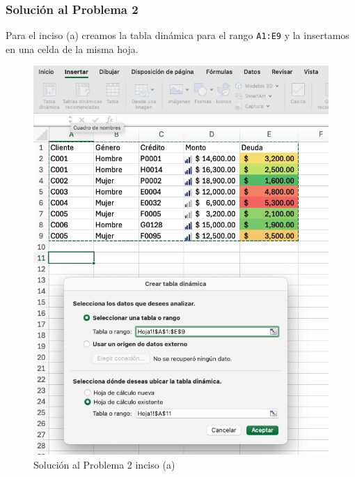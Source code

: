 \documentclass{article}
\begin{document}
\clearpage

\subsubsection*{Solución al Problema 2}

Para el inciso (a) creamos la tabla dinámica para el rango \texttt{A1:E9} y la insertamos en una celda de la misma hoja.
\begin{figure}[!ht]
    \centering
    \begin{minipage}{\textwidth}
        \centering
        \includegraphics[width=\textwidth]{figures/s102-1.png}
    \end{minipage}
    \captionsetup{width=0.9\textwidth}
    \caption{Solución al Problema 2 inciso (a)}
    \label{fig:s102-1}
\end{figure}
\end{document}
